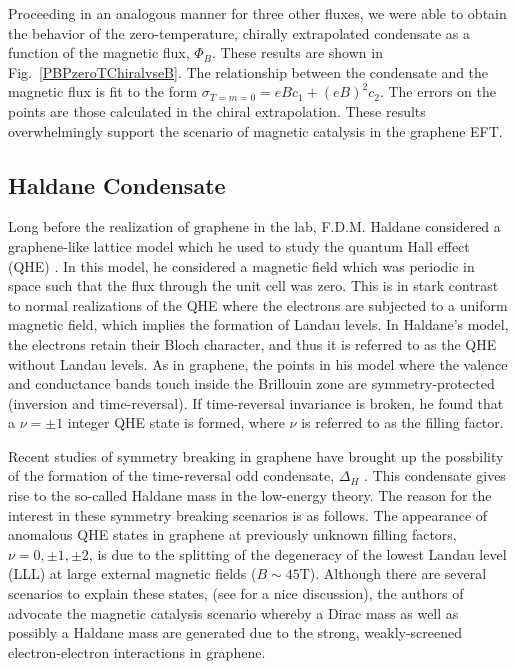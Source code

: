 \documentclass[aps,prd,twocolumn,showpacs,superscriptaddress,groupedaddress]{revtex4}  %
\begin{document}
Proceeding in an analogous manner for three other fluxes, we were able to obtain the behavior of the zero-temperature, chirally extrapolated condensate as a function of the magnetic flux, $\Phi_B$. These results are shown in Fig.~\ref{PBPzeroTChiralvseB}.
The relationship between the condensate and the magnetic flux is fit to the form $\sigma_{T=m=0} = eBc_1 + (eB)^2c_2$. The errors on the points are those calculated in the chiral extrapolation. These results overwhelmingly support the scenario of magnetic catalysis in the graphene EFT.

\subsection{\label{sec:HaldaneCond}Haldane Condensate}
Long before the realization of graphene in the lab, F.D.M. Haldane considered a graphene-like lattice model which he used to study the quantum Hall effect (QHE) \cite{Haldane}.
In this model, he considered a magnetic field which was periodic in space such that the flux through the unit cell was zero. This is in stark contrast to normal realizations of the QHE 
where the electrons are subjected to a uniform magnetic field, which implies the formation of Landau levels. In Haldane's model, the electrons retain their Bloch character, and thus it is referred to 
as the QHE without Landau levels. As in graphene, the points in his model where the valence and conductance bands touch inside the Brillouin zone are symmetry-protected (inversion and time-reversal).
If time-reversal invariance is broken, he found that a $\nu = \pm 1$ integer QHE state is formed, where $\nu$ is referred to as the filling factor. 

Recent studies of symmetry breaking in graphene have brought up the possbility of the formation of the time-reversal odd condensate, $\Delta_H$ \cite{GonzalezHaldaneMass, MiranskyGraphene2,MiranskyGraphene3}. This condensate gives rise to the so-called Haldane mass in the low-energy theory.
The reason for the interest in these symmetry breaking scenarios is as follows.
The appearance of anomalous QHE states in graphene at previously unknown filling factors, $\nu = 0, \pm 1, \pm 2$, is due to the splitting of the degeneracy of the lowest Landau level (LLL) at large external magnetic fields ($B \sim 45 \text{T}$).
Although there are several scenarios to explain these states, (see \cite{Yang} for a nice discussion), the authors of \cite{MiranskyGraphene2, MiranskyGraphene3} advocate the magnetic catalysis scenario whereby a Dirac mass as well as possibly a Haldane mass are generated due to the strong, weakly-screened
electron-electron interactions in graphene.
\end{document}
